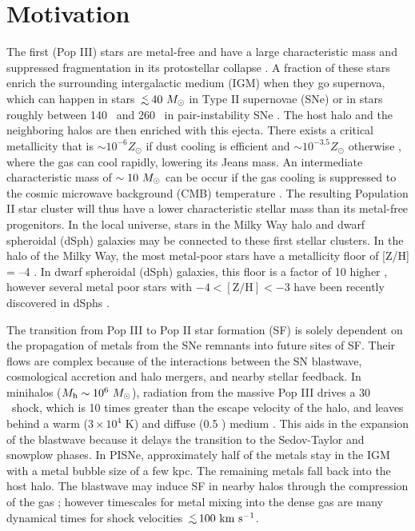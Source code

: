 \documentclass[apjl]{emulateapj}
\begin{document}

\section{Motivation}

The first (Pop III) stars are metal-free and have a large
characteristic mass and suppressed fragmentation in its protostellar
collapse \citep{Abel00, ABN02, Bromm02_P3, Yoshida03, OShea07a}.  A
fraction of these stars enrich the surrounding intergalactic medium
(IGM) when they go supernova, which can happen in stars $\lsim40~\Ms$
in Type II supernovae (SNe) or in stars roughly between 140 \Ms~and
260 \Ms~in pair-instability SNe \citep[PISNe;][]{2002ApJ...567..532H}.
The host halo and the neighboring halos are then enriched with this
ejecta.  There exists a critical metallicity that is $\sim 10^{-6}
Z_\odot$ if dust cooling is efficient \citep{Omukai05,
  Schneider06_Frag, clark08} and $\sim 10^{-3.5} Z_\odot$ otherwise
\citep{Bromm01, 2009ApJ...691..441S}, where the gas can cool rapidly,
lowering its Jeans mass.  An intermediate characteristic mass of
$\sim10~\Ms$ can be occur if the gas cooling is suppressed to the
cosmic microwave background (CMB) temperature \citep{Larson98,
  Tumlinson07_IMF, 2009ApJ...691..441S}.  The resulting Population II
star cluster will thus have a lower characteristic stellar mass than
its metal-free progenitors.  In the local universe, stars in the Milky
Way halo and dwarf spheroidal (dSph) galaxies may be connected to
these first stellar clusters.  In the halo of the Milky Way, the most
metal-poor stars have a metallicity floor of [Z/H] = --4
\citep{Beers05}.  In dwarf spheroidal (dSph) galaxies, this floor is a
factor of 10 higher \citep{Tolstoy04, Helmi06}, however several metal
poor stars with $-4 < [\mathrm{Z/H}] < -3$ have been recently
discovered in dSphs \citep{Tafelmeyer10, Frebel10_Obs}.

The transition from Pop III to Pop II star formation (SF) is solely
dependent on the propagation of metals from the SNe remnants into
future sites of SF.  Their flows are complex because of the
interactions between the SN blastwave, cosmological accretion and halo
mergers, and nearby stellar feedback.  In minihalos ($M_{\rm h} \sim
10^6~\Ms$), radiation from the massive Pop III drives a 30 \kms~shock,
which is 10 times greater than the escape velocity of the halo, and
leaves behind a warm ($3 \times 10^4$ K) and diffuse (0.5 \cubecm)
medium \citep{Kitayama04, Whalen04, Abel07}.  This aids in the
expansion of the blastwave because it delays the transition to the
Sedov-Taylor and snowplow phases.  In PISNe, approximately half of the
metals stay in the IGM with a metal bubble size of a few kpc.  The
remaining metals fall back into the host halo.  The blastwave may
induce SF in nearby halos through the compression of the gas
\citep{Ferrara98}; however timescales for metal mixing into the dense
gas are many dynamical times \citep{Cen08} for shock velocities $\lsim
100~\kms$.
\end{document}
